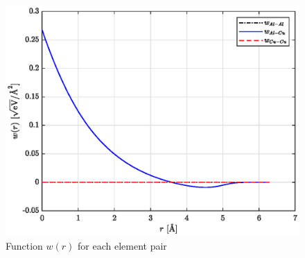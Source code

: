 \documentclass{article}
\begin{document}
\begin{figure}[h!]
	\centering
	\includegraphics[scale=0.6]{Figures/w_AlCu.eps}
	\caption{Function $w(r)$ for each element pair}
\end{figure}


\vspace{30cm}

\text{                           }

\newpage




 








 
 
\end{document}
